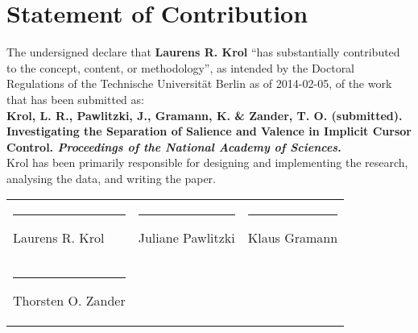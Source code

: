 \documentclass[a4paper,12pt]{article}
\title{}
\author{}
\date{}
\begin{document}
\thispagestyle{empty}

\section*{Statement of Contribution}

The undersigned declare that \textbf{Laurens R. Krol} ``has substantially contributed to the concept, content, or methodology'', as intended by the Doctoral Regulations of the Technische Universität Berlin as of 2014-02-05, of the work that has been submitted as: \\

\textbf{Krol, L. R., Pawlitzki, J., Gramann, K. \& Zander, T. O. (submitted). Investigating the Separation of Salience and Valence in Implicit Cursor Control. \textit{Proceedings of the National Academy of Sciences}.} \\

Krol has been primarily responsible for designing and implementing the research, analysing the data, and writing the paper. \\

\begin{tabularx}{\textwidth}{XXX}
\vspace{2cm} \hrule Laurens R. Krol & \vspace{2cm} \hrule Juliane Pawlitzki & \vspace{2cm} \hrule Klaus Gramann \\
\vspace{2cm} \hrule Thorsten O. Zander &  & 
\end{tabularx}
\end{document}

